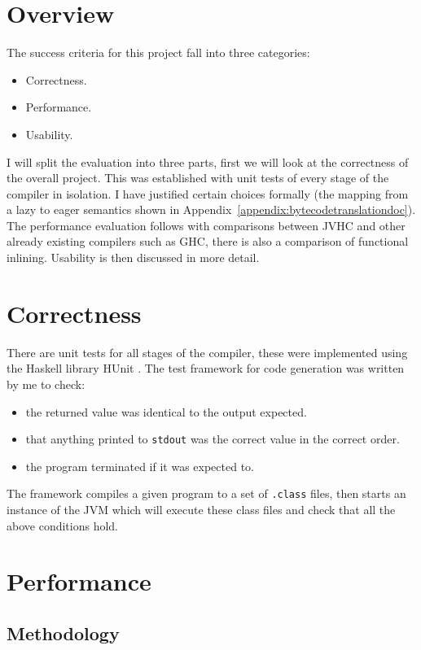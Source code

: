 \documentclass[float=false, crop=false]{standalone}
\begin{document}
\section{Overview}

The success criteria for this project fall into three categories:
\begin{itemize}
  \item Correctness.
  \item Performance.
  \item Usability.
\end{itemize}

I will split the evaluation into three parts, first we will
look at the correctness of the overall project. This was established 
with unit tests of every stage of the compiler in isolation. I 
have justified certain choices formally (the mapping from a lazy to eager semantics
shown in Appendix~\ref{appendix:bytecodetranslationdoc}). The performance evaluation follows 
with comparisons between JVHC and other already existing compilers such as
GHC, there is also a comparison of functional inlining. Usability is then discussed in more detail.

\section{Correctness}

There are unit tests for all stages of the compiler, these were implemented 
using the Haskell library HUnit \cite{hunit-lib}. The test framework for code generation
was written by me to check:
\begin{itemize}
  \item the returned value was identical to the output expected. 
  \item that anything printed to \texttt{stdout} was the correct value in the correct order. 
  \item the program terminated if it was expected to.
\end{itemize}
  The framework compiles a given program to a set of \texttt{.class} files, then 
  starts an instance of the JVM which will execute these class files
  and check that all the above conditions hold.
\section{Performance}

\subsection{Methodology}
\end{document}
